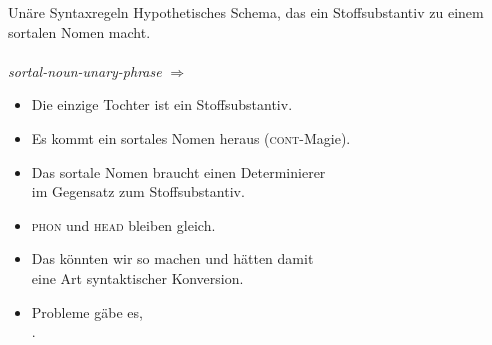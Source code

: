 \begin{frame}
  {Unäre Syntaxregeln}
  \onslide<+->
  \onslide<+->
  Hypothetisches Schema, das ein Stoffsubstantiv zu einem sortalen Nomen macht.\\
  \\
  \onslide<+->
  \Zeile
  \textit{sortal-noun-unary-phrase} $\Rightarrow$\\
  \Viertelzeile
  \begin{minipage}{0.425\textwidth}
  \end{minipage}%
  \onslide<+->%
  \begin{minipage}{0.55\textwidth}
    \begin{itemize}[<+->]\footnotesize
      \item Die einzige Tochter ist ein Stoffsubstantiv.
      \item Es kommt ein sortales Nomen heraus (\textsc{cont}-Magie).
      \item Das sortale Nomen braucht einen Determinierer\\
        im Gegensatz zum Stoffsubstantiv.
      \item \textsc{phon} und \textsc{head} bleiben gleich.
        \Halbzeile
      \item Das könnten wir so machen und hätten damit\\
        eine Art \alert{syntaktischer Konversion}.
      \item Probleme gäbe es, \\
        .
    \end{itemize}
  \end{minipage}
\end{frame}

